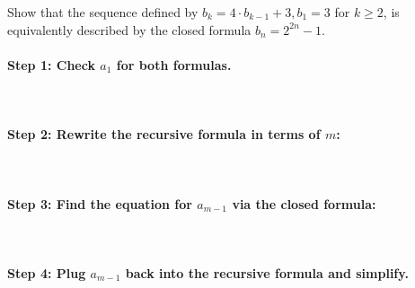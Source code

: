 \documentclass[a4paper,12pt]{book}
\newcounter{question}
\begin{document}
        \begin{questionNOGRADE}{\thequestion}

            Show that the sequence defined by $b_{k} = 4 \cdot b_{k-1} + 3, b_{1} = 3$ for $k \geq 2$,
            is equivalently described by the closed formula $b_{n} = 2^{2n} - 1$.

        \paragraph{Step 1: Check $a_{1}$ for both formulas.} ~\\
            
        \paragraph{Step 2: Rewrite the recursive formula in terms of $m$:} ~\\

        \paragraph{Step 3: Find the equation for $a_{m-1}$ via the closed formula:} ~\\

        \paragraph{Step 4: Plug $a_{m-1}$ back into the recursive formula and simplify.} ~\\

        \end{questionNOGRADE}
\end{document}
